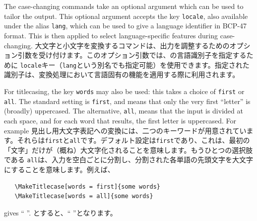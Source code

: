 \documentclass{ltxguide}
\newcommand\jpnewline{\vspace{3pt}\newline}
\begin{document}
The case-changing commands take an optional argument which can be used to
tailor the output. This optional argument accepts the key \texttt{locale}, also
available under the alias \texttt{lang}, which can be used to give a language
identifier in BCP-47 format. This is then applied to select language-specific
features during case-changing.
\jpnewline
大文字と小文字を変換するコマンドは、出力を調整するためのオプション引数を受け付けます。このオプション引数では、の言語識別子を指定するために \texttt{locale}キー（\texttt{lang}という別名でも指定可能）を使用できます。指定された識別子は、変換処理において言語固有の機能を適用する際に利用されます。

For titlecasing, the key \texttt{words} may also be used: this
takes a choice of \texttt{first} or \texttt{all}. The standard
setting is \texttt{first}, and means that only the very first
\enquote{letter} is (broadly) uppercased. The alternative,
\texttt{all}, means that the input is divided at each space, and
for each word that results, the first letter is uppercased. For
example
\jpnewline
見出し用大文字表記への変換には、二つのキーワードが用意されています。それらは\texttt{first}と\texttt{all}です。デフォルト設定は\texttt{first}であり、これは、最初の「文字」だけが（概ね）大文字化されることを意味します。もうひとつの選択肢である \texttt{all}は、入力を空白ごとに分割し、分割された各単語の先頭文字を大文字にすることを意味します。例えば、

\begin{verbatim}
   \MakeTitlecase[words = first]{some words}
   \MakeTitlecase[words = all]{some words}
\end{verbatim}
gives \enquote{
}.
\jpnewline
とすると、\enquote{ }となります。
\end{document}
